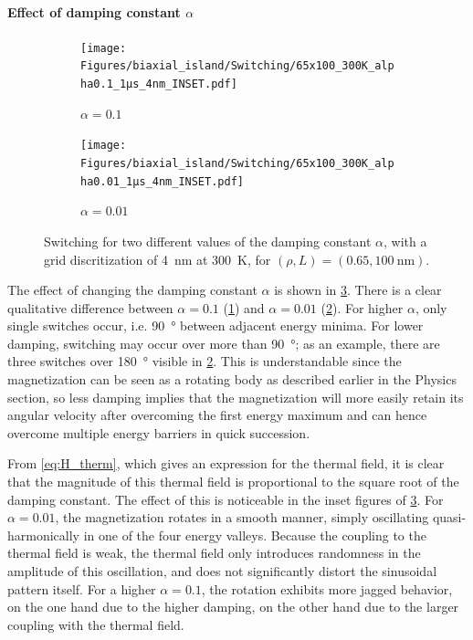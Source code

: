 \documentclass[11pt,a4paper,english]{article}
\begin{document}
\paragraph{Effect of damping constant $\alpha$}
\begin{figure}
     \centering
     \begin{subfigure}[b]{0.8\textwidth}
         \centering
         \texttt{[image: Figures/biaxial\_island/Switching/65x100\_300K\_alpha0.1\_1µs\_4nm\_INSET.pdf]}
         \caption{$\alpha=0.1$}
         \label{fig:switching-alpha-0.1}
     \end{subfigure}
     \hfill
     \begin{subfigure}[b]{0.8\textwidth}
         \centering
         \texttt{[image: Figures/biaxial\_island/Switching/65x100\_300K\_alpha0.01\_1µs\_4nm\_INSET.pdf]}
         \caption{$\alpha = 0.01$}
         \label{fig:switching-alpha-0.01}
     \end{subfigure}
        \caption{Switching for two different values of the damping constant $\alpha$, with a grid discritization of \SI{4}{\nano\metre} at \SI{300}{\kelvin}, for $(\rho, L) = (0.65, \SI{100}{\nano\metre})$.}
        \label{fig:switching-alpha}
\end{figure}
The effect of changing the damping constant $\alpha$ is shown in \cref{fig:switching-alpha}. There is a clear qualitative difference between $\alpha=0.1$ (\cref{fig:switching-alpha-0.1}) and $\alpha=0.01$ (\cref{fig:switching-alpha-0.01}). For higher $\alpha$, only single switches occur, i.e. \SI{90}{\degree} between adjacent energy minima. For lower damping, switching may occur over more than \SI{90}{\degree}; as an example, there are three switches over \SI{180}{\degree} visible in \cref{fig:switching-alpha-0.01}. This is understandable since the magnetization can be seen as a rotating body as described earlier in the Physics section, so less damping implies that the magnetization will more easily retain its angular velocity after overcoming the first energy maximum and can hence overcome multiple energy barriers in quick succession. \par
From \cref{eq:H_therm}, which gives an expression for the thermal field, it is clear that the magnitude of this thermal field is proportional to the square root of the damping constant. The effect of this is noticeable in the inset figures of \cref{fig:switching-alpha}. For $\alpha=0.01$, the magnetization rotates in a smooth manner, simply oscillating quasi-harmonically in one of the four energy valleys. Because the coupling to the thermal field is weak, the thermal field only introduces randomness in the amplitude of this oscillation, and does not significantly distort the sinusoidal pattern itself. For a higher $\alpha=0.1$, the rotation exhibits more jagged behavior, on the one hand due to the higher damping, on the other hand due to the larger coupling with the thermal field. \par
\end{document}

